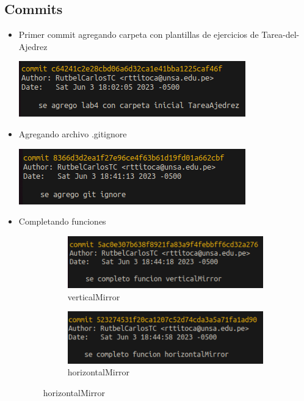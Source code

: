 \documentclass{article}
\begin{document}
\subsection{Commits}
\begin{itemize}
	\item Primer commit agregando carpeta con plantillas de ejercicios de Tarea-del-Ajedrez
	      \begin{center}
		      \includegraphics[]{img/commits/commit-ajedrez.png}
	      \end{center}
	\item Agregando archivo .gitignore
	      \begin{center}
		      \includegraphics[]{img/commits/commit-gitignore.png}
	      \end{center}
    \item Completando funciones
    \begin{figure}[H]
        \centering
        \begin{subfigure}[b]{0.4\textwidth}
          \centering
          \includegraphics[scale=0.5]{img/commits/verticalMirror.png}
          \caption{verticalMirror}
        \end{subfigure}
        \hfill
        \begin{subfigure}[b]{0.4\textwidth}
          \centering
          \includegraphics[scale=0.5]{img/commits/horizontalMirror.png}
          \caption{horizontalMirror}
        \end{subfigure}
        

\end{figure}
\end{itemize}
\end{document}
